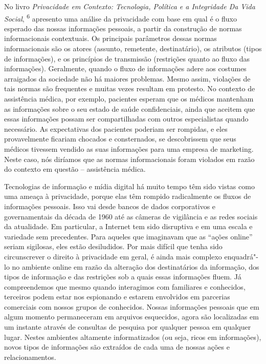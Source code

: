 No livro \emph{Privacidade em Contexto: Tecnologia, Política e a
Integridade Da Vida Social}, \textsuperscript{{6}} apresento uma análise
da privacidade com base em qual é o fluxo esperado das nossas
informações pessoais, a partir da construção de normas informacionais
contextuais. Os principais parâmetros dessas normas informacionais são
os atores (assunto, remetente, destinatário), os atributos (tipos de
informações), e os princípios de transmissão (restrições quanto ao fluxo
das informações). Geralmente, quando o fluxo de informações adere aos
costumes arraigados da sociedade não há maiores problemas. Mesmo assim,
violações de tais normas são frequentes e muitas vezes resultam em
protesto. No contexto de assistência médica, por exemplo, pacientes
esperam que os médicos mantenham as informações sobre o seu estado de
saúde confidenciais, ainda que aceitem que essas informações possam ser
compartilhadas com outros especialistas quando necessário. As
expectativas dos pacientes poderiam ser rompidas, e eles provavelmente
ficariam chocados e consternados, se descobrissem que seus médicos
tivessem vendido as suas informações para uma empresa de marketing.
Neste caso, nós diríamos que as normas informacionais foram violados em
razão do contexto em questão -- assistência médica.

Tecnologias de informação e mídia digital há muito tempo têm sido vistas
como uma ameaça à privacidade, porque elas têm rompido radicalmente os
fluxos de informações pessoais. Isso vai desde bancos de dados
corporativos e governamentais da década de 1960 até as câmeras de
vigilância e as redes sociais da atualidade. Em particular, a Internet
tem sido disruptiva e em uma escala e variedade sem precedentes. Para
aqueles que imaginavam que as ``ações online'' seriam sigilosas, eles
estão desiludidos. Por mais difícil que tenha sido circunscrever o
direito à privacidade em geral, é ainda mais complexo enquadrá"-lo no
ambiente online em razão da alteração dos destinatários da informação,
dos tipos de informação e das restrições sob a quais essas informações
fluem. Já compreendemos que mesmo quando interagimos com familiares e
conhecidos, terceiros podem estar nos espionando e estarem envolvidos em
parcerias comerciais com nossos grupos de conhecidos. Nossas informações
pessoais que em algum momento permaneceram em arquivos esquecidos, agora
são localizadas em um instante através de consultas de pesquisa por
qualquer pessoa em qualquer lugar. Nestes ambientes altamente
informatizados (ou seja, ricos em informações), novos tipos de
informações são extraídos de cada uma de nossas ações e relacionamentos.

